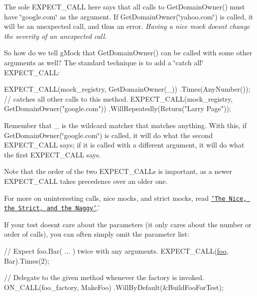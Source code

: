 The sole {\ttfamily E\+X\+P\+E\+C\+T\+\_\+\+C\+A\+LL} here says that all calls to {\ttfamily Get\+Domain\+Owner()} must have {\ttfamily \char`\"{}google.\+com\char`\"{}} as the argument. If {\ttfamily Get\+Domain\+Owner(\char`\"{}yahoo.\+com\char`\"{})} is called, it will be an unexpected call, and thus an error. {\itshape Having a nice mock doesn\textquotesingle{}t change the severity of an unexpected call.}

So how do we tell g\+Mock that {\ttfamily Get\+Domain\+Owner()} can be called with some other arguments as well? The standard technique is to add a \char`\"{}catch all\char`\"{} {\ttfamily E\+X\+P\+E\+C\+T\+\_\+\+C\+A\+LL}\+:


\begin{DoxyCode}
EXPECT\_CALL(mock\_registry, GetDomainOwner(\_))
      .Times(AnyNumber());  \textcolor{comment}{// catches all other calls to this method.}
EXPECT\_CALL(mock\_registry, GetDomainOwner(\textcolor{stringliteral}{"google.com"}))
      .WillRepeatedly(Return(\textcolor{stringliteral}{"Larry Page"}));
\end{DoxyCode}


Remember that {\ttfamily \+\_\+} is the wildcard matcher that matches anything. With this, if {\ttfamily Get\+Domain\+Owner(\char`\"{}google.\+com\char`\"{})} is called, it will do what the second {\ttfamily E\+X\+P\+E\+C\+T\+\_\+\+C\+A\+LL} says; if it is called with a different argument, it will do what the first {\ttfamily E\+X\+P\+E\+C\+T\+\_\+\+C\+A\+LL} says.

Note that the order of the two {\ttfamily E\+X\+P\+E\+C\+T\+\_\+\+C\+A\+LL}s is important, as a newer {\ttfamily E\+X\+P\+E\+C\+T\+\_\+\+C\+A\+LL} takes precedence over an older one.

For more on uninteresting calls, nice mocks, and strict mocks, read \href{#NiceStrictNaggy}{\tt \char`\"{}\+The Nice, the Strict, and the Naggy\char`\"{}}.

If your test doesn\textquotesingle{}t care about the parameters (it only cares about the number or order of calls), you can often simply omit the parameter list\+:


\begin{DoxyCode}
\textcolor{comment}{// Expect foo.Bar( ... ) twice with any arguments.}
EXPECT\_CALL(\mbox{\hyperlink{namespacefoo}{foo}}, Bar).Times(2);

\textcolor{comment}{// Delegate to the given method whenever the factory is invoked.}
ON\_CALL(foo\_factory, MakeFoo)
    .WillByDefault(&BuildFooForTest);
\end{DoxyCode}


